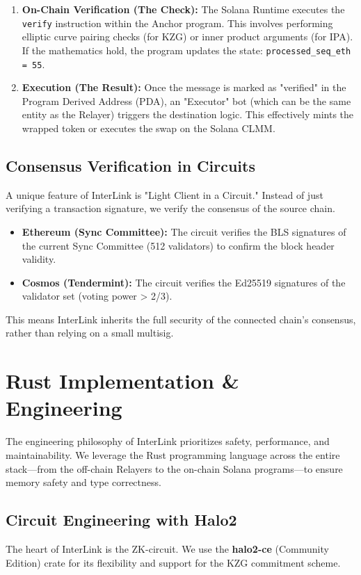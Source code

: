 \documentclass[11pt,a4paper]{article}
\begin{document}
\begin{enumerate}
    \item \textbf{On-Chain Verification (The Check):} The Solana Runtime executes the \texttt{verify} instruction within the Anchor program. This involves performing elliptic curve pairing checks (for KZG) or inner product arguments (for IPA). If the mathematics hold, the program updates the state: \texttt{processed\_seq\_eth = 55}.
    
    \item \textbf{Execution (The Result):} Once the message is marked as "verified" in the Program Derived Address (PDA), an "Executor" bot (which can be the same entity as the Relayer) triggers the destination logic. This effectively mints the wrapped token or executes the swap on the Solana CLMM.
\end{enumerate}

\subsection{Consensus Verification in Circuits}
A unique feature of InterLink is "Light Client in a Circuit." Instead of just verifying a transaction signature, we verify the consensus of the source chain.
\begin{itemize}
    \item \textbf{Ethereum (Sync Committee):} The circuit verifies the BLS signatures of the current Sync Committee (512 validators) to confirm the block header validity.
    \item \textbf{Cosmos (Tendermint):} The circuit verifies the Ed25519 signatures of the validator set (voting power > 2/3).
\end{itemize}
This means InterLink inherits the full security of the connected chain's consensus, rather than relying on a small multisig.

\section{Rust Implementation \& Engineering}
\label{sec:impl}

The engineering philosophy of InterLink prioritizes safety, performance, and maintainability. We leverage the Rust programming language across the entire stack---from the off-chain Relayers to the on-chain Solana programs---to ensure memory safety and type correctness.

\subsection{Circuit Engineering with Halo2}
The heart of InterLink is the ZK-circuit. We use the \textbf{halo2-ce} (Community Edition) crate for its flexibility and support for the KZG commitment scheme.
\end{document}
